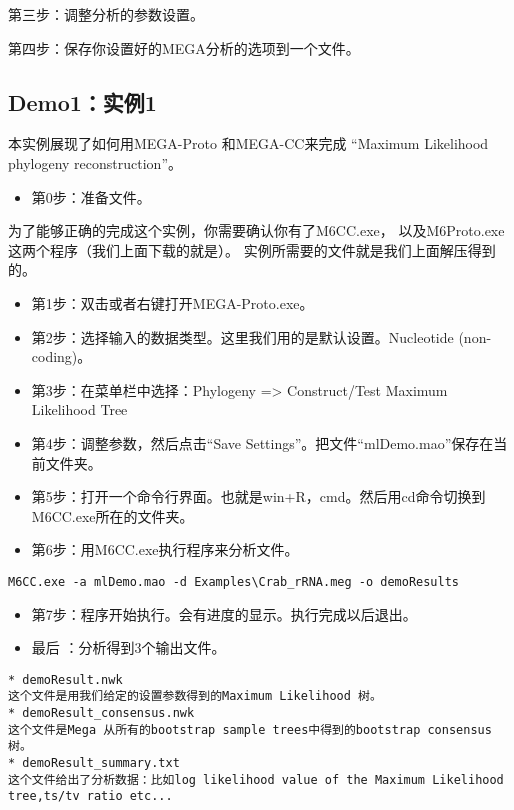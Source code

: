 \documentclass{ctexart}
\begin{document}
第三步：调整分析的参数设置。

第四步：保存你设置好的MEGA分析的选项到一个文件。
\subsection{Demo1：实例1}
\label{sec-3-6}

本实例展现了如何用MEGA-Proto 和MEGA-CC来完成
“Maximum Likelihood phylogeny reconstruction”。

\begin{itemize}
\item 第0步：准备文件。
\end{itemize}
为了能够正确的完成这个实例，你需要确认你有了M6CC.exe，
以及M6Proto.exe这两个程序（我们上面下载的就是）。
实例所需要的文件就是我们上面解压得到的。
\begin{itemize}
\item 第1步：双击或者右键打开MEGA-Proto.exe。
\item 第2步：选择输入的数据类型。这里我们用的是默认设置。Nucleotide (non-coding)。
\item 第3步：在菜单栏中选择：Phylogeny => Construct/Test Maximum Likelihood Tree
\item 第4步：调整参数，然后点击“Save Settings”。把文件“mlDemo.mao”保存在当前文件夹。
\item 第5步：打开一个命令行界面。也就是win+R，cmd。然后用cd命令切换到M6CC.exe所在的文件夹。
\item 第6步：用M6CC.exe执行程序来分析文件。
\end{itemize}

\begin{lstlisting}
M6CC.exe -a mlDemo.mao -d Examples\Crab_rRNA.meg -o demoResults
\end{lstlisting}
\begin{itemize}
\item 第7步：程序开始执行。会有进度的显示。执行完成以后退出。
\item 最后 ：分析得到3个输出文件。
\end{itemize}

\begin{verbatim}
* demoResult.nwk
这个文件是用我们给定的设置参数得到的Maximum Likelihood 树。
* demoResult_consensus.nwk
这个文件是Mega 从所有的bootstrap sample trees中得到的bootstrap consensus树。
* demoResult_summary.txt
这个文件给出了分析数据：比如log likelihood value of the Maximum Likelihood tree,ts/tv ratio etc...
\end{verbatim}
\end{document}
